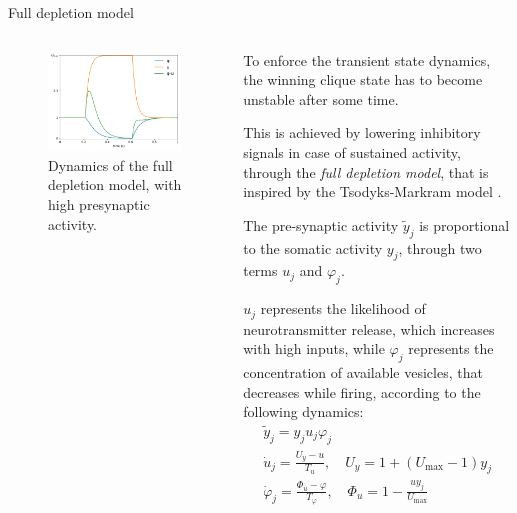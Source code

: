 \documentclass[final,hyperref={pdfpagelabels=false}]{beamer}
\begin{document}
\begin{frame}
\begin{columns}
\begin{column}{.64\textwidth}
\begin{minipage}[T]{.95\textwidth}
{					%
					\begin{block}{Full depletion model}
						\begin{columns}
							\begin{column}[T]{.5\textwidth}
							\begin{figure}
								\includegraphics[width=1\linewidth]{full_depletion.pdf}
								\caption{Dynamics of the full depletion model, with high presynaptic activity.}
								\label{fig:full_depletion}
							\end{figure}	
							\end{column}							
							
							\begin{column}[T]{.5\textwidth}
								To enforce the transient state dynamics, the winning clique state has to become unstable after some time. 
								
								This is achieved by lowering inhibitory signals in case of sustained activity, through the \emph{full depletion model}, that is inspired by the Tsodyks-Markram model \cite{tsodyks2008model}.
								
								The pre-synaptic activity $\tilde{y}_j$ is proportional to the somatic activity $y_j$, through two terms $u_j$ and $\varphi_j$.
								
								$u_j$ represents the likelihood of neurotransmitter release, which increases with high inputs, while $\varphi_j$ represents the concentration of available vesicles, that decreases while firing, according to the following dynamics:						
								\begin{gather*}
									\tilde{y}_j = y_j u_j \varphi_j \\
									\dot{u}_j = \frac{U_y -u}{T_u}, \quad U_y = 1 + \left( U_\text{max} -1 \right) y_j\\ 
									\dot{\varphi}_j = \frac{\varPhi_u - \varphi}{T_\varphi}, \quad \varPhi_u = 1- \frac{u y_j}{U_\text{max}} \\	
								\end{gather*}


\end{column}
\end{columns}
\end{block}}
\end{minipage}
\end{column}
\end{columns}
\end{frame}
\end{document}
